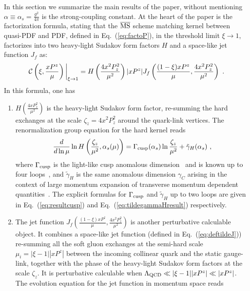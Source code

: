\documentclass[a4paper,11pt]{article}
\begin{document}
In this section we summarize the main results of the paper, without mentioning $\alpha\equiv \alpha_s=\frac{g^2}{4\pi}$ is the strong-coupling constant.
At the heart of the paper is the factorization formula, stating that the $\overline{\rm MS}$ scheme matching kernel between quasi-PDF and PDF, defined in Eq.~(\ref{eq:factoP}), in the threshold limit $\xi \rightarrow 1$, factorizes into two heavy-light Sudakov form factors $H$ and a space-like jet function $J_f$ as:
\begin{align}\label{eq:finalmatchingC}
{\cal C}\left(\xi,\frac{xP^z}{\mu}\right)\bigg|_{\xi \rightarrow 1}=H\left(\frac{4x^2P_z^2}{\mu^2}\right)|xP^z|J_f\left(\frac{(1-\xi)xP^z}{\mu},\frac{4x^2P_z^2}{\mu^2}\right)  \ .
\end{align}
In this formula, one has
\begin{enumerate}
    \item $H\left(\frac{4xP_z^2}{\mu^2}\right)$ is the heavy-light Sudakov form factor, re-summing the hard exchanges at the scale $\zeta_z=4x^2P_z^2$ around the quark-link vertices. The renormalization group equation for the hard kernel reads 
\begin{align}
\frac{d}{d\ln \mu} \ln H\left(\frac{\zeta_z}{\mu^2},\alpha_s(\mu)\right)=\Gamma_{\rm cusp}(\alpha_s)\ln\frac{\zeta_z}{\mu^2}+\tilde {\gamma}_{H}(\alpha_s) \ ,
\end{align}    
where $\Gamma_{\rm cusp}$ is the light-like cusp anomalous dimension~\cite{Korchemsky:1987wg} and is known up to four loops~\cite{Henn:2019swt,vonManteuffel:2020vjv}, and $\tilde \gamma_{H}$ is the same anomalous dimension $\gamma_{C}$ arising in the context of large momentum expansion of transverse momentum dependent quantities~\cite{Ji:2019ewn,Ji:2020ect,Ji:2021znw}.
The explicit formulas for $\Gamma_{\rm cusp}$ and $\tilde \gamma_H$ up to two loops are given in Eq.~(\ref{eq:resultcusp}) and Eq.~(\ref{eq:tildegammaHresult}) respectively.
\item The jet function $J_f\left(\frac{(1-\xi)xP^z}{\mu},\frac{4x^2 P_z^2}{\mu^2}\right)$ is another perturbative calculable object.   It combines a space-like jet function (defined in Eq.~(\ref{eq:deftildeJ})) re-summing all the soft gluon exchanges at the semi-hard scale $\mu_i=|\xi-1||xP^z|$ between the incoming collinear quark and the static gauge-link, together with the phase of the heavy-light Sudakov form factors at the scale $\zeta_z$.  It is perturbative calculable when $\Lambda_{\rm QCD}\ll |\xi-1||xP^z| \ll |xP^z|$.  The evolution equation for the jet function in momentum space reads

\end{enumerate}
\end{document}
